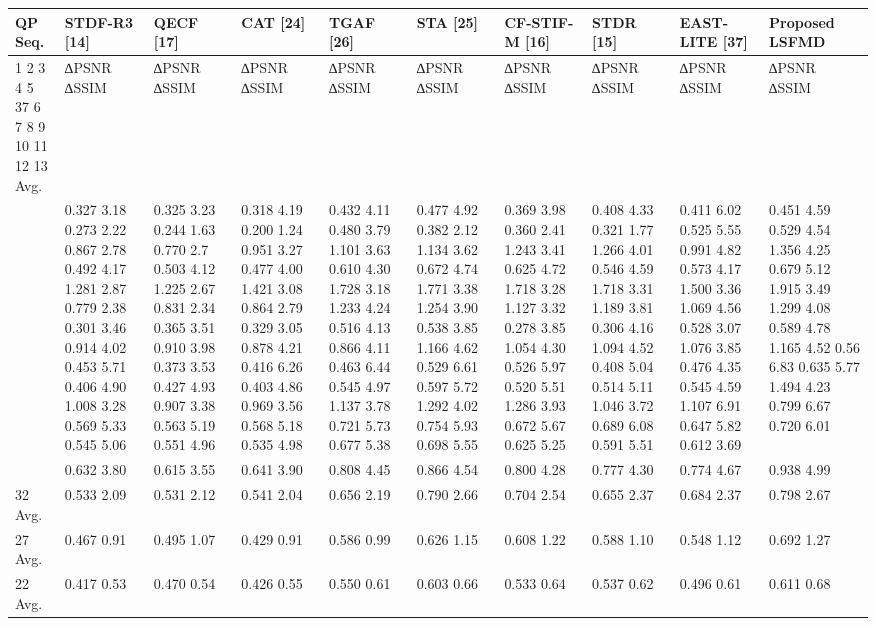 \begin{tabular}{llllllllll}
\toprule
QP Seq. & STDF-R3 [14] & QECF [17] & CAT [24] & TGAF [26] & STA [25] & CF-STIF-M [16] & STDR [15] & EAST-LITE [37] & Proposed LSFMD \\
\midrule
1 2 3 4 5 37 6 7 8 9 10 11 12 13 Avg. & ∆PSNR ∆SSIM & ∆PSNR ∆SSIM & ∆PSNR ∆SSIM & ∆PSNR ∆SSIM & ∆PSNR ∆SSIM & ∆PSNR ∆SSIM & ∆PSNR ∆SSIM & ∆PSNR ∆SSIM & ∆PSNR ∆SSIM \\
 & 0.327 3.18 0.273 2.22 0.867 2.78 0.492 4.17 1.281 2.87 0.779 2.38 0.301 3.46 0.914 4.02 0.453 5.71 0.406 4.90 1.008 3.28 0.569 5.33 0.545 5.06 & 0.325 3.23 0.244 1.63 0.770 2.7 0.503 4.12 1.225 2.67 0.831 2.34 0.365 3.51 0.910 3.98 0.373 3.53 0.427 4.93 0.907 3.38 0.563 5.19 0.551 4.96 & 0.318 4.19 0.200 1.24 0.951 3.27 0.477 4.00 1.421 3.08 0.864 2.79 0.329 3.05 0.878 4.21 0.416 6.26 0.403 4.86 0.969 3.56 0.568 5.18 0.535 4.98 & 0.432 4.11 0.480 3.79 1.101 3.63 0.610 4.30 1.728 3.18 1.233 4.24 0.516 4.13 0.866 4.11 0.463 6.44 0.545 4.97 1.137 3.78 0.721 5.73 0.677 5.38 & 0.477 4.92 0.382 2.12 1.134 3.62 0.672 4.74 1.771 3.38 1.254 3.90 0.538 3.85 1.166 4.62 0.529 6.61 0.597 5.72 1.292 4.02 0.754 5.93 0.698 5.55 & 0.369 3.98 0.360 2.41 1.243 3.41 0.625 4.72 1.718 3.28 1.127 3.32 0.278 3.85 1.054 4.30 0.526 5.97 0.520 5.51 1.286 3.93 0.672 5.67 0.625 5.25 & 0.408 4.33 0.321 1.77 1.266 4.01 0.546 4.59 1.718 3.31 1.189 3.81 0.306 4.16 1.094 4.52 0.408 5.04 0.514 5.11 1.046 3.72 0.689 6.08 0.591 5.51 & 0.411 6.02 0.525 5.55 0.991 4.82 0.573 4.17 1.500 3.36 1.069 4.56 0.528 3.07 1.076 3.85 0.476 4.35 0.545 4.59 1.107 6.91 0.647 5.82 0.612 3.69 & 0.451 4.59 0.529 4.54 1.356 4.25 0.679 5.12 1.915 3.49 1.299 4.08 0.589 4.78 1.165 4.52 0.56 6.83 0.635 5.77 1.494 4.23 0.799 6.67 0.720 6.01 \\
 & 0.632 3.80 & 0.615 3.55 & 0.641 3.90 & 0.808 4.45 & 0.866 4.54 & 0.800 4.28 & 0.777 4.30 & 0.774 4.67 & 0.938 4.99 \\
32 Avg. & 0.533 2.09 & 0.531 2.12 & 0.541 2.04 & 0.656 2.19 & 0.790 2.66 & 0.704 2.54 & 0.655 2.37 & 0.684 2.37 & 0.798 2.67 \\
27 Avg. & 0.467 0.91 & 0.495 1.07 & 0.429 0.91 & 0.586 0.99 & 0.626 1.15 & 0.608 1.22 & 0.588 1.10 & 0.548 1.12 & 0.692 1.27 \\
22 Avg. & 0.417 0.53 & 0.470 0.54 & 0.426 0.55 & 0.550 0.61 & 0.603 0.66 & 0.533 0.64 & 0.537 0.62 & 0.496 0.61 & 0.611 0.68 \\
\bottomrule
\end{tabular}
